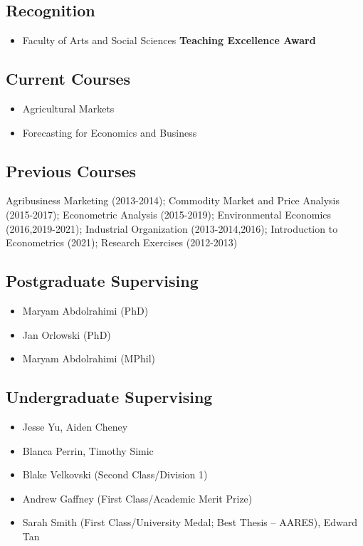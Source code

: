 \documentclass[10pt]{article}
\begin{document}
	\subsection*{Recognition}
	\begin{itemize}
		\item {} Faculty of Arts and Social Sciences \textbf{Teaching Excellence Award}
	\end{itemize}
	\subsection*{Current Courses}
	\begin{itemize}
		\item {} Agricultural Markets
		\item {} Forecasting for Economics and Business
	\end{itemize}
	
	\subsection*{Previous Courses}	
	Agribusiness Marketing (2013-2014); Commodity Market and Price Analysis (2015-2017); Econometric Analysis (2015-2019); Environmental Economics (2016,2019-2021); Industrial Organization (2013-2014,2016); Introduction to Econometrics (2021); Research Exercises (2012-2013)
	
	\subsection*{Postgraduate Supervising}	
	\begin{itemize}
		\item {} Maryam Abdolrahimi (PhD)
		\item {} Jan Orlowski (PhD)
		\item {} Maryam Abdolrahimi (MPhil)
	\end{itemize}

	\subsection*{Undergraduate Supervising}	
	\begin{itemize}
		\item {} Jesse Yu, Aiden Cheney
		\item {} Blanca Perrin, Timothy Simic
		\item {} Blake Velkovski (Second Class/Division 1)
		\item {} Andrew Gaffney (First Class/Academic Merit Prize)
		\item {} Sarah Smith (First Class/University Medal; Best Thesis -- AARES), Edward Tan
	\end{itemize}
	
\end{document}
